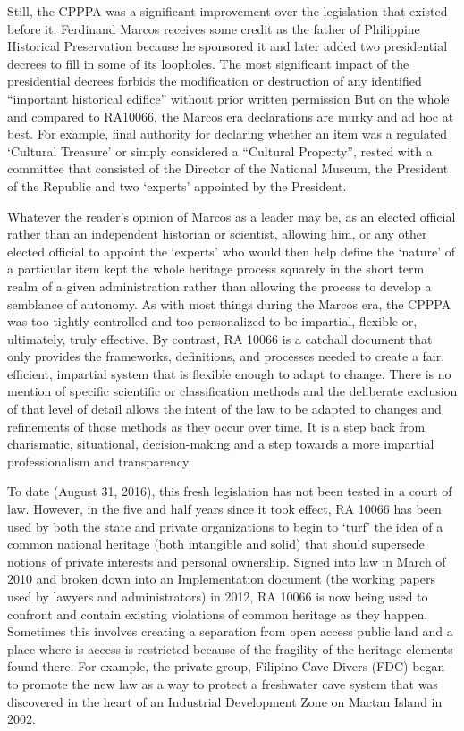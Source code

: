 Still, the CPPPA was a significant improvement over the legislation that existed before it. Ferdinand Marcos receives some credit as the father of Philippine Historical Preservation because he sponsored it and later added two presidential decrees %
to fill in some of its loopholes. The most significant impact of the presidential decrees forbids the modification or destruction of any identified “important historical edifice” without prior written permission %
But on the whole and compared to RA10066, the Marcos era declarations are murky and ad hoc at best. For example, final authority for declaring whether an item was a regulated ‘Cultural Treasure’ or simply considered a “Cultural Property”, rested with a committee that consisted of the Director of the National Museum, the President of the Republic and two ‘experts’ appointed by the President. 

Whatever the reader’s opinion of Marcos as a leader may be, as an elected official rather than an independent historian or scientist, allowing him, or any other elected official to appoint the ‘experts’ who would then help define the ‘nature’ of a particular item kept the whole heritage process squarely in the short term realm of a given administration rather than allowing the process to develop a semblance of autonomy. As with most things during the Marcos era, the CPPPA was too tightly controlled and too personalized to be impartial, flexible or, ultimately, truly effective. By contrast, RA 10066 is a catchall document that only provides the frameworks, definitions, and processes needed to create a fair, efficient, impartial system that is flexible enough to adapt to change. There is no mention of specific scientific or classification methods and the deliberate exclusion of that level of detail allows the intent of the law to be adapted to changes and refinements of those methods as they occur over time. It is a step back from charismatic, situational, decision-making and a step towards a more impartial professionalism and transparency.

To date (August 31, 2016), this fresh legislation has not been tested in a court of law. However, in the five and half years since it took effect, RA 10066 has been used by both the state and private organizations to begin to ‘turf’ the idea of a common national heritage (both intangible and solid) that should supersede notions of private interests and personal ownership. Signed into law in March of 2010
 and broken down into an Implementation document (the working papers used by lawyers and administrators) in 2012, 
 RA 10066 is now being used to confront and contain existing violations of common heritage as they happen. Sometimes this involves creating a separation from open access public land and a place where is access is restricted because of the fragility of the heritage elements found there. For example, the private group, Filipino Cave Divers (FDC) began to promote the new law as a way to protect a freshwater cave system that was discovered in the heart of an Industrial Development Zone on Mactan Island in 2002. 

